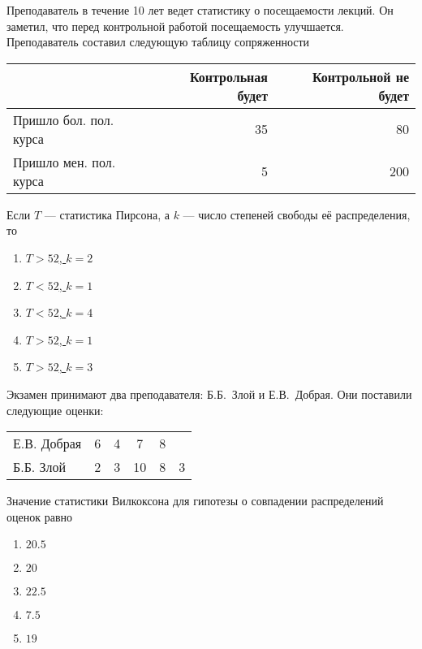 \documentclass[t]{beamer}
\begin{document}
 \begin{frame} \label{47} 
\begin{block}{47} 

Преподаватель в течение 10 лет ведет статистику о посещаемости лекций. Он заметил, что перед контрольной работой посещаемость улучшается. Преподаватель составил следующую таблицу сопряженности
\small
\begin{tabular}{lrr}
  \toprule
   & Контрольная будет & Контрольной не будет \\
   \midrule
   Пришло бол. пол. курса & 35 & 80 \\
   Пришло мен. пол. курса & 5 & 200 \\
  \bottomrule
\end{tabular}
\vspace{5mm}

Если $T$ — статистика Пирсона, а $k$ — число степеней свободы её распределения, то


 \end{block} 
\begin{enumerate} 
\item[] \hyperlink{47-No}{\beamergotobutton{} $T>52$, $k=2$}
\item[] \hyperlink{47-No}{\beamergotobutton{} $T<52$, $k=1$}
\item[] \hyperlink{47-No}{\beamergotobutton{} $T<52$, $k=4$}
\item[] \hyperlink{47-Yes}{\beamergotobutton{} $T>52$, $k=1$}
\item[] \hyperlink{47-No}{\beamergotobutton{} $T>52$, $k=3$}
\end{enumerate} 
\end{frame} 


 \begin{frame} \label{48} 
\begin{block}{48} 

Экзамен принимают два преподавателя: Б.Б.~Злой и Е.В.~Добрая. Они поставили следующие оценки:

\vspace{5mm}
\begin{tabular}{lccccc}
  \toprule
   Е.В. Добрая & 6 & 4 & 7  & 8 &   \\
   Б.Б. Злой   & 2 & 3 & 10 & 8 & 3 \\
  \bottomrule
\end{tabular}
\vspace{5mm}


Значение статистики Вилкоксона для гипотезы о совпадении распределений оценок равно


 \end{block} 
\begin{enumerate} 
\item[] \hyperlink{48-No}{\beamergotobutton{} $20.5$}
\item[] \hyperlink{48-No}{\beamergotobutton{} $20$}
\item[] \hyperlink{48-Yes}{\beamergotobutton{} $22.5$}
\item[] \hyperlink{48-No}{\beamergotobutton{} $7.5$}
\item[] \hyperlink{48-No}{\beamergotobutton{} $19$}
\end{enumerate} 
\end{frame} 
\end{document}
